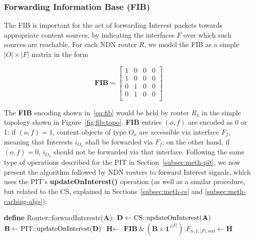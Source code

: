 \subsubsection{Forwarding Information Base (FIB)}
\label{subsec:meth-fib}

The FIB is important for the act of forwarding Interest packets towards 
appropriate content sources, by indicating the interfaces $F$ over which such 
sources are reachable. For each NDN router $R$, we model the FIB as a simple 
$|O| \times |F|$ matrix in the form

\begin{equation}
\textbf{FIB} = \begin{bmatrix} 1 & 0 & 0 & 0  \\ 
                1 & 0 & 0 & 0               \\ 
                0 & 1 & 0 & 0               \\ 
                0 & 1 & 0 & 0               \\ \end{bmatrix}
    \label{eq:fib}
\end{equation}\shortvertbreak

The \textbf{FIB} encoding shown in~\ref{eq:fib} would be held by router $R_1$ in the 
simple topology shown in Figure~\ref{fig:fib-topo}. \textbf{FIB} entries 
$(o,f)$ are encoded as 0 or 1: if $(o,f) = 1$, content objects of 
type $O_o$ are accessible via interface $F_f$, meaning that Interests 
$i_{O_o}$ shall be forwarded via $F_f$; on the other hand, 
if $(o,f) = 0$, $i_{O_o}$ should not be forwarded via that interface. 
Following the same type of operations described for the PIT 
in Section~\ref{subsec:meth-pit}, we now present the algorithm followed by NDN 
routers to forward Interest signals, which uses the PIT's 
\textbf{updateOnInterest()} operation (as well as a similar procedure, but 
related to the CS, explained in Sections~\ref{subsec:meth-cs} and 
\ref{subsec:meth-caching-algs}):\shortvertbreak 

\begin{algorithmic}[1]

\State \textbf{define} Router::forwardInterests($\textbf{A}$):
\State
    \State $\textbf{D} \leftarrow \text{CS::updateOnInterest(\textbf{A})}$
    \State $\textbf{B} \leftarrow \text{PIT::updateOnInterest(\textbf{D})}$
    \State $\textbf{H} \leftarrow$ $\textbf{FIB} \ \& \ (\textbf{B} \times \textbf{1}'^{|F|})$
    \State $F_{n,1:|F|,out} \leftarrow \textbf{H}$

\end{algorithmic}\shortvertbreak

